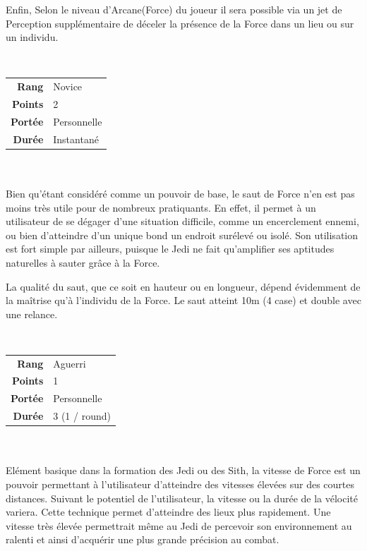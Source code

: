 \begin{description}[align=left]
        Enfin, Selon le niveau d'Arcane(Force) du joueur il sera possible via un jet de Perception supplémentaire de déceler la présence de la Force dans un lieu ou sur un individu.
        \\  

    \item [Saut de Force] ~ \\

        \begin{tabular}{ r l }
            \textbf{Rang}    & Novice \\
            \textbf{Points}  & 2 \\
            \textbf{Portée}  & Personnelle \\
            \textbf{Durée}   & Instantané \\
        \end{tabular}
        \\ \\
        Bien qu'étant considéré comme un pouvoir de base, le saut de Force n'en est pas moins très utile pour de nombreux pratiquants. En effet, il permet à un utilisateur de se dégager d'une situation difficile, comme un encerclement ennemi, ou bien d'atteindre d'un unique bond un endroit surélevé ou isolé. Son utilisation est fort simple par ailleurs, puisque le Jedi ne fait qu'amplifier ses aptitudes naturelles à sauter grâce à la Force. 

        La qualité du saut, que ce soit en hauteur ou en longueur, dépend évidemment de la maîtrise qu'à l'individu de la Force. Le saut atteint 10m (4 case) et double avec une relance.
        \\

    \item [Vitesse de Force] ~ \\

        \begin{tabular}{ r l }
            \textbf{Rang}    & Aguerri \\
            \textbf{Points}  & 1 \\
            \textbf{Portée}  & Personnelle \\
            \textbf{Durée}   & 3 (1 / round) \\
        \end{tabular}
        \\ \\
        Elément basique dans la formation des Jedi ou des Sith, la vitesse de Force est un pouvoir permettant à l'utilisateur d'atteindre des vitesses élevées sur des courtes distances. Suivant le potentiel de l'utilisateur, la vitesse ou la durée de la vélocité variera. Cette technique permet d'atteindre des lieux plus rapidement. Une vitesse très élevée permettrait même au Jedi de percevoir son environnement au ralenti et ainsi d'acquérir une plus grande précision au combat.


\end{description}
